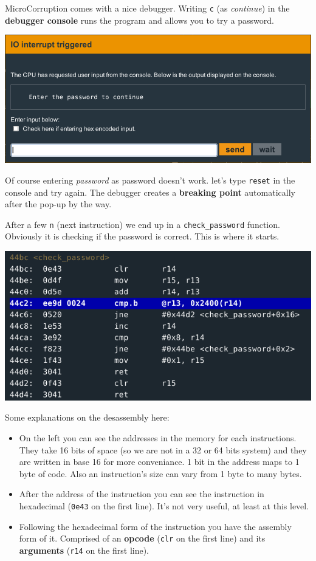 MicroCorruption comes with a nice debugger. Writing \texttt{c} (as
\emph{continue}) in the \textbf{debugger console} runs the program and
allows you to try a password.

\includegraphics{img/1_2.png}

Of course entering \emph{password} as password doesn't work. let's type
\texttt{reset} in the console and try again. The debugger creates a
\textbf{breaking point} automatically after the pop-up by the way.

After a few \texttt{n} (next instruction) we end up in a
\texttt{check\_password} function. Obviously it is checking if the
password is correct. This is where it starts.

\includegraphics{img/1_3.png}

Some explanations on the desassembly here:

\begin{itemize}
\item
  On the left you can see the addresses in the memory for each
  instructions. They take 16 bits of space (so we are not in a 32 or 64
  bits system) and they are written in base 16 for more conveniance. 1
  bit in the address maps to 1 byte of code. Also an instruction's size
  can vary from 1 byte to many bytes.
\item
  After the address of the instruction you can see the instruction in
  hexadecimal (\texttt{0e43} on the first line). It's not very useful,
  at least at this level.
\item
  Following the hexadecimal form of the instruction you have the
  assembly form of it. Comprised of an \textbf{opcode} (\texttt{clr} on
  the first line) and its \textbf{arguments} (\texttt{r14} on the first
  line).
\end{itemize}

